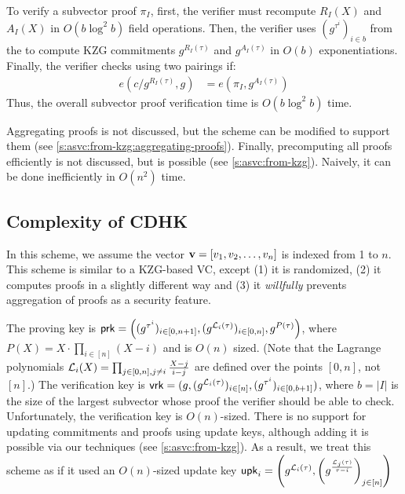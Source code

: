 To verify a subvector proof $\pi_I$, first, the verifier must recompute $R_I(X)$ and $A_I(X)$ in $O(b\log^2{b})$ field operations.
Then, the verifier uses $(g^{\tau^i})_{i\in b}$ from the \vrk to compute KZG commitments $g^{R_I(\tau)}$ and $g^{A_I(\tau)}$ in $O(b)$ exponentiations.
Finally, the verifier checks using two pairings if:
\begin{align}
e(c/g^{R_I(\tau)},g) &= e(\pi_I, g^{A_I(\tau)})
\end{align}
Thus, the overall subvector proof verification time is $O(b\log^2{b})$ time.

Aggregating proofs is not discussed, but the scheme can be modified to support them (see \cref{s:asvc:from-kzg:aggregating-proofs}).
Finally, precomputing all proofs efficiently is not discussed, but is possible (see \cref{s:asvc:from-kzg}).
Naively, it can be done inefficiently in $O(n^2)$ time.

\subsection{Complexity of CDHK~\cite{CDHK15}}
\label{s:complexity-kzg-lagr}
In this scheme, we assume the vector $\bm{\mathrm{v}}=[v_1, v_2, \dots, v_n]$ is indexed from 1 to $n$.
This scheme is similar to a KZG-based VC, except (1) it is randomized, (2) it computes proofs in a slightly different way and (3) it \textit{willfully} prevents aggregation of proofs as a security feature.

The proving key is $\mathsf{prk}=\left((g^{\tau^i})_{i\in [0,n+1]}, (g^{\mathcal{L}_i(\tau)})_{i\in[0,n]},g^{P(\tau)}\right)$, where $P(X)=X\cdot \prod_{i\in[n]} (X-i)$ and is $O(n)$ sized.
(Note that the Lagrange polynomials $\mathcal{L}_i(X)=\prod_{j\in[0,n],j\ne i} \frac{X-j}{i-j}$ are defined over the points $[0,n]$, not $[n]$.)
The verification key is $\mathsf{vrk}=(g,(g^{\mathcal{L}_i(\tau)})_{i\in [n]},(g^{\tau^i})_{i\in [0,b+1]})$, where $b=|I|$ is the size of the largest subvector whose proof the verifier should be able to check.
Unfortunately, the verification key is $O(n)$-sized.
There is no support for updating commitments and proofs using update keys, although adding it is possible via our techniques (see \cref{s:asvc:from-kzg}).
As a result, we treat this scheme as if it used an $O(n)$-sized update key $\mathsf{upk}_i=\left(g^{\mathcal{L}_i(\tau)}, \left(g^\frac{\mathcal{L}_j(\tau)}{\tau - i}\right)_{j\in[n]}\right)$

